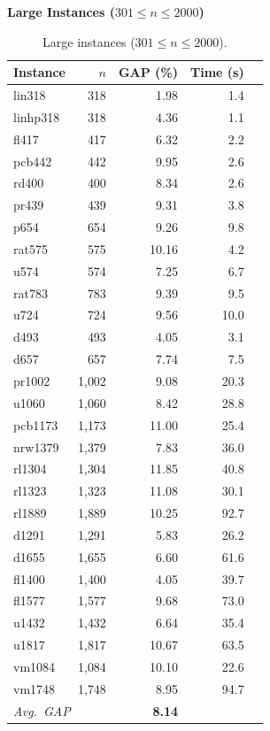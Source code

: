 \documentclass[runningheads]{llncs}
\begin{document}
\textbf{Large Instances ($301 \le n \le 2000$)}

\begin{table}
\caption{Large instances ($301\!\le\!n\!\le\!2000$).}\label{tab:large}
\centering\small
\begin{tabular}{@{}lrrrr@{}}
\toprule
\textbf{Instance} & $n$ & \textbf{GAP (\%)} & \textbf{Time (s)} \\
\midrule
lin318    &     318 &  1.98 &    1.4 \\
linhp318  &     318 &  4.36 &    1.1 \\
fl417     &     417 &  6.32 &    2.2 \\
pcb442    &     442 &  9.95 &    2.6 \\
rd400     &     400 &  8.34 &    2.6 \\
pr439     &     439 &  9.31 &    3.8 \\
p654      &     654 &  9.26 &    9.8 \\
rat575    &     575 & 10.16 &    4.2 \\
u574      &     574 &  7.25 &    6.7 \\
rat783    &     783 &  9.39 &    9.5 \\
u724      &     724 &  9.56 &   10.0 \\
d493      &     493 &  4.05 &    3.1 \\
d657      &     657 &  7.74 &    7.5 \\
\midrule
pr1002    & 1{,}002 &  9.08 &   20.3 \\
u1060     & 1{,}060 &  8.42 &   28.8 \\
pcb1173   & 1{,}173 & 11.00 &   25.4 \\
nrw1379   & 1{,}379 &  7.83 &   36.0 \\
rl1304    & 1{,}304 & 11.85 &   40.8 \\
rl1323    & 1{,}323 & 11.08 &   30.1 \\
rl1889    & 1{,}889 & 10.25 &   92.7 \\
d1291     & 1{,}291 &  5.83 &   26.2 \\
d1655     & 1{,}655 &  6.60 &   61.6 \\
fl1400    & 1{,}400 &  4.05 &   39.7 \\
fl1577    & 1{,}577 &  9.68 &   73.0 \\
u1432     & 1{,}432 &  6.64 &   35.4 \\
u1817     & 1{,}817 & 10.67 &   63.5 \\
vm1084    & 1{,}084 & 10.10 &   22.6 \\
vm1748    & 1{,}748 &  8.95 &   94.7 \\
\midrule
\multicolumn{2}{l}{\textit{Avg.\ GAP}} & \textbf{8.14} & \\
\bottomrule
\end{tabular}
\end{table}
\end{document}
